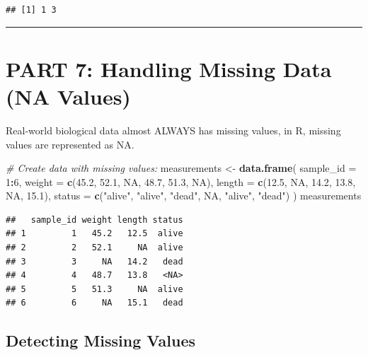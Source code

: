 \documentclass[
]{article}
\newenvironment{Shaded}{\begin{snugshade}}{\end{snugshade}}
\newcommand{\AttributeTok}[1]{\textcolor[rgb]{0.13,0.29,0.53}{#1}}
\newcommand{\CommentTok}[1]{\textcolor[rgb]{0.56,0.35,0.01}{\textit{#1}}}
\newcommand{\ConstantTok}[1]{\textcolor[rgb]{0.56,0.35,0.01}{#1}}
\newcommand{\DecValTok}[1]{\textcolor[rgb]{0.00,0.00,0.81}{#1}}
\newcommand{\FloatTok}[1]{\textcolor[rgb]{0.00,0.00,0.81}{#1}}
\newcommand{\FunctionTok}[1]{\textcolor[rgb]{0.13,0.29,0.53}{\textbf{#1}}}
\newcommand{\NormalTok}[1]{#1}
\newcommand{\OtherTok}[1]{\textcolor[rgb]{0.56,0.35,0.01}{#1}}
\newcommand{\SpecialCharTok}[1]{\textcolor[rgb]{0.81,0.36,0.00}{\textbf{#1}}}
\newcommand{\StringTok}[1]{\textcolor[rgb]{0.31,0.60,0.02}{#1}}
\begin{document}
\begin{verbatim}
## [1] 1 3
\end{verbatim}

\begin{center}\rule{0.5\linewidth}{0.5pt}\end{center}

\section{PART 7: Handling Missing Data (NA
Values)}\label{part-7-handling-missing-data-na-values}

Real-world biological data almost ALWAYS has missing values, in R,
missing values are represented as NA.

\begin{Shaded}
\begin{Highlighting}[]
\CommentTok{\# Create data with missing values:}
\NormalTok{measurements }\OtherTok{\textless{}{-}} \FunctionTok{data.frame}\NormalTok{(}
  \AttributeTok{sample\_id =} \DecValTok{1}\SpecialCharTok{:}\DecValTok{6}\NormalTok{,}
  \AttributeTok{weight =} \FunctionTok{c}\NormalTok{(}\FloatTok{45.2}\NormalTok{, }\FloatTok{52.1}\NormalTok{, }\ConstantTok{NA}\NormalTok{, }\FloatTok{48.7}\NormalTok{, }\FloatTok{51.3}\NormalTok{, }\ConstantTok{NA}\NormalTok{),}
  \AttributeTok{length =} \FunctionTok{c}\NormalTok{(}\FloatTok{12.5}\NormalTok{, }\ConstantTok{NA}\NormalTok{, }\FloatTok{14.2}\NormalTok{, }\FloatTok{13.8}\NormalTok{, }\ConstantTok{NA}\NormalTok{, }\FloatTok{15.1}\NormalTok{),}
  \AttributeTok{status =} \FunctionTok{c}\NormalTok{(}\StringTok{"alive"}\NormalTok{, }\StringTok{"alive"}\NormalTok{, }\StringTok{"dead"}\NormalTok{, }\ConstantTok{NA}\NormalTok{, }\StringTok{"alive"}\NormalTok{, }\StringTok{"dead"}\NormalTok{)}
\NormalTok{)}
\NormalTok{measurements}
\end{Highlighting}
\end{Shaded}

\begin{verbatim}
##   sample_id weight length status
## 1         1   45.2   12.5  alive
## 2         2   52.1     NA  alive
## 3         3     NA   14.2   dead
## 4         4   48.7   13.8   <NA>
## 5         5   51.3     NA  alive
## 6         6     NA   15.1   dead
\end{verbatim}

\subsection{Detecting Missing Values}\label{detecting-missing-values}
\end{document}
